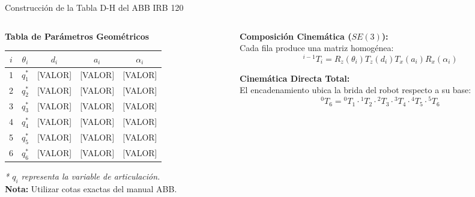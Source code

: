 \documentclass[aspectratio=169, table, xcdraw]{beamer}
\begin{document}
\begin{frame}{Construcción de la Tabla D-H del ABB IRB 120}
    \begin{columns}[T]
        \begin{column}{0.5\textwidth}
            \textbf{Tabla de Parámetros Geométricos}
            \vspace{0.2cm}
            \begin{table}[]
                \centering
                \renewcommand{\arraystretch}{1.2}
                \begin{tabular}{c|c|c|c|c}
                \toprule
                $i$ & $\theta_i$ & $d_i$ & $a_i$ & $\alpha_i$ \\ \midrule
                1 & $q_1^*$ & [VALOR] & [VALOR] & [VALOR] \\
                2 & $q_2^*$ & [VALOR] & [VALOR] & [VALOR] \\
                3 & $q_3^*$ & [VALOR] & [VALOR] & [VALOR] \\
                4 & $q_4^*$ & [VALOR] & [VALOR] & [VALOR] \\
                5 & $q_5^*$ & [VALOR] & [VALOR] & [VALOR] \\
                6 & $q_6^*$ & [VALOR] & [VALOR] & [VALOR] \\ \bottomrule
                \end{tabular}
            \end{table}
            \footnotesize \textit{* $q_i$ representa la variable de articulación.} \\
            \footnotesize \textbf{Nota:} Utilizar cotas exactas del manual ABB.
        \end{column}
        
        \begin{column}{0.5\textwidth}
            \textbf{Composición Cinemática ($SE(3)$):} \\
            Cada fila produce una matriz homogénea:
            \small
            \begin{equation*}
                ^{i-1}T_i = R_z(\theta_i) T_z(d_i) T_x(a_i) R_x(\alpha_i)
            \end{equation*}
            \normalsize
            
            \vspace{0.2cm}
            \textbf{Cinemática Directa Total:} \\
            El encadenamiento ubica la brida del robot respecto a su base:
            \begin{equation*}
                ^0T_6 = {}^0T_1 \cdot {}^1T_2 \cdot {}^2T_3 \cdot {}^3T_4 \cdot {}^4T_5 \cdot {}^5T_6
            \end{equation*}
        \end{column}
    \end{columns}
\end{frame}
\end{document}
